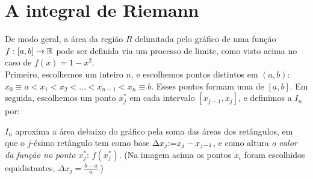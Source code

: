 \section{A integral de Riemann}\label{Sec:IntRiemann}

De modo geral, a área da região $R$ delimitada pelo gráfico de uma função
$f:[a,b]\to \mathbb{R}$ pode ser definida via um processo de limite,
como visto acima no caso de $f(x)=1-x^2$.\\

Primeiro, 
escolhemos um inteiro $n$, e escolhemos pontos distintos em $(a,b)$:
$x_0\equiv a<x_1<x_2<\dots<x_{n-1}<x_n\equiv b$. 
Esses pontos formam uma  de $[a,b]$.
Em seguida, escolhemos um
ponto $x_j^*$ em cada intervalo $[x_{j-1},x_{j}]$, e definimos a  $I_n$ por:
\begin{center}
 \begin{bmlimage}\end{bmlimage}
\end{center}
$I_n$ aproxima a área debaixo do gráfico pela soma das áreas dos retângulos, em
que o $j$-ésimo retângulo tem como base $\Delta x_j{:=} x_{j}-x_{j-1}$, e
como altura \emph{o valor da função no ponto $x_j^*$}: $f(x_j^*)$. (Na imagem
acima os pontos $x_i$ foram escolhidos equidistantes,
$\Delta x_{j}=\tfrac{b-a}{n}$.)\\

